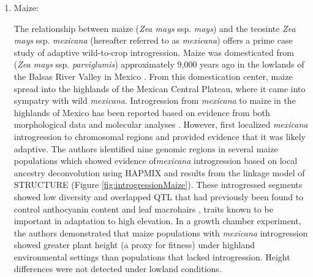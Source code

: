 \documentclass[11pt]{article}
\begin{document}
\begin{enumerate}
\item{Maize:}






The relationship between maize (\emph{Zea mays} ssp. \emph{mays}) and the teosinte \emph{Zea mays} ssp. \emph{mexicana} (hereafter referred to as \emph{mexicana}) offers a prime case study of adaptive wild-to-crop introgression.
Maize was domesticated from (\emph{Zea mays} ssp. \emph{parviglumis}) approximately 9,000 years ago in the lowlands of the Balsas River Valley in Mexico \cite{matsuoka2002single}.
From this domestication center, maize spread into the highlands of the Mexican Central Plateau, where it came into sympatry with wild \emph{mexicana}.
Introgression from \emph{mexicana} to maize in the highlands of Mexico has been reported based on evidence from both morphological data \cite {wilkes1977, lauter2004, doebley1984} and molecular analyses \cite{matsuoka2002, vanHeerwaarden2011, doebley1987, warburton2011, fukunaga2005}.
However, \citep{hufford2013} first localized \emph{mexicana} introgression to chromosomal regions and provided evidence that it was likely adaptive.
The authors identified nine genomic regions in several maize populations which showed evidence of\emph{mexicana} introgression based on local ancestry deconvolution using HAPMIX and results from the linkage model of STRUCTURE (Figure \ref{fig:introgressionMaize}).
These introgressed segments showed low diversity and overlapped QTL that had previously been found to control anthocyanin content and leaf macrohairs \cite{lauter2004}, traits known to be important in adaptation to high elevation.
In a growth chamber experiment, the authors demonstrated that maize populations with \emph{mexicana} introgression showed greater plant height (a proxy for fitness) under highland environmental settings than populations that lacked introgression.
Height differences were not detected under lowland conditions.



\end{enumerate}
\end{document}
